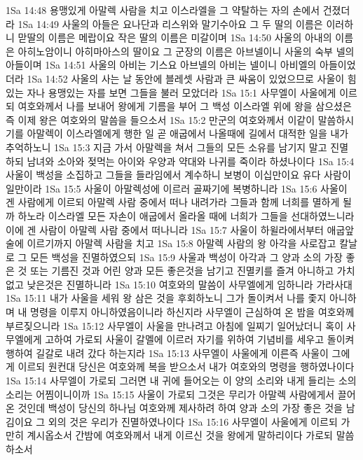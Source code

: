 1Sa 14:48  용맹있게 아말렉 사람을 치고 이스라엘을 그 약탈하는 자의 손에서 건졌더라
1Sa 14:49  사울의 아들은 요나단과 리스위와 말기수아요 그 두 딸의 이름은 이러하니 맏딸의 이름은 메랍이요 작은 딸의 이름은 미갈이며
1Sa 14:50  사울의 아내의 이름은 아히노암이니 아히마아스의 딸이요 그 군장의 이름은 아브넬이니 사울의 숙부 넬의 아들이며
1Sa 14:51  사울의 아비는 기스요 아브넬의 아비는 넬이니 아비엘의 아들이었더라
1Sa 14:52  사울의 사는 날 동안에 블레셋 사람과 큰 싸움이 있었으므로 사울이 힘있는 자나 용맹있는 자를 보면 그들을 불러 모았더라
1Sa 15:1  사무엘이 사울에게 이르되 여호와께서 나를 보내어 왕에게 기름을 부어 그 백성 이스라엘 위에 왕을 삼으셨은즉 이제 왕은 여호와의 말씀을 들으소서
1Sa 15:2  만군의 여호와께서 이같이 말씀하시기를 아말렉이 이스라엘에게 행한 일 곧 애굽에서 나올때에 길에서 대적한 일을 내가 추억하노니
1Sa 15:3  지금 가서 아말렉을 쳐서 그들의 모든 소유를 남기지 말고 진멸 하되 남녀와 소아와 젖먹는 아이와 우양과 약대와 나귀를 죽이라 하셨나이다
1Sa 15:4  사울이 백성을 소집하고 그들을 들라임에서 계수하니 보병이 이십만이요 유다 사람이 일만이라
1Sa 15:5  사울이 아말렉성에 이르러 골짜기에 복병하니라
1Sa 15:6  사울이 겐 사람에게 이르되 아말렉 사람 중에서 떠나 내려가라 그들과 함께 너희를 멸하게 될까 하노라 이스라엘 모든 자손이 애굽에서 올라올 때에 너희가 그들을 선대하였느니라 이에 겐 사람이 아말렉 사람 중에서 떠나니라
1Sa 15:7  사울이 하윌라에서부터 애굽앞 술에 이르기까지 아말렉 사람을 치고
1Sa 15:8  아말렉 사람의 왕 아각을 사로잡고 칼날로 그 모든 백성을 진멸하였으되
1Sa 15:9  사울과 백성이 아각과 그 양과 소의 가장 좋은 것 또는 기름진 것과 어린 양과 모든 좋은것을 남기고 진멸키를 즐겨 아니하고 가치없고 낮은것은 진멸하니라
1Sa 15:10  여호와의 말씀이 사무엘에게 임하니라 가라사대
1Sa 15:11  내가 사울을 세워 왕 삼은 것을 후회하노니 그가 돌이켜서 나를 좇지 아니하며 내 명령을 이루지 아니하였음이니라 하신지라 사무엘이 근심하여 온 밤을 여호와께 부르짖으니라
1Sa 15:12  사무엘이 사울을 만나려고 아침에 일찌기 일어났더니 혹이 사무엘에게 고하여 가로되 사울이 갈멜에 이르러 자기를 위하여 기념비를 세우고 돌이켜 행하여 길갈로 내려 갔다 하는지라
1Sa 15:13  사무엘이 사울에게 이른즉 사울이 그에게 이르되 원컨대 당신은 여호와께 복을 받으소서 내가 여호와의 명령을 행하였나이다
1Sa 15:14  사무엘이 가로되 그러면 내 귀에 들어오는 이 양의 소리와 내게 들리는 소의 소리는 어찜이니이까
1Sa 15:15  사울이 가로되 그것은 무리가 아말렉 사람에게서 끌어 온 것인데 백성이 당신의 하나님 여호와께 제사하려 하여 양과 소의 가장 좋은 것을 남김이요 그 외의 것은 우리가 진멸하였나이다
1Sa 15:16  사무엘이 사울에게 이르되 가만히 계시옵소서 간밤에 여호와께서 내게 이르신 것을 왕에게 말하리이다 가로되 말씀하소서
